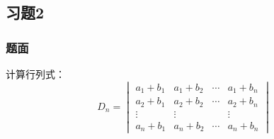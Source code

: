 \documentclass[9pt,xcolor=svgnames]{beamer} %
\begin{document}
\subsection*{习题2}
\begin{frame}
    \frametitle{题面}
    计算行列式：
    \begin{equation*}
        D_n=
        \begin{vmatrix}
            a_{1}+b_{1} & a_{1}+b_{2} & \cdots & a_{1}+b_{n} \\
            a_{2}+b_{1} & a_{2}+b_{2} & \cdots & a_{2}+b_{n} \\
            \vdots      & \vdots      &        & \vdots      \\
            a_{n}+b_{1} & a_{n}+b_{2} & \cdots & a_{n}+b_{n}
        \end{vmatrix}
    \end{equation*}
\end{frame}
\end{document}
